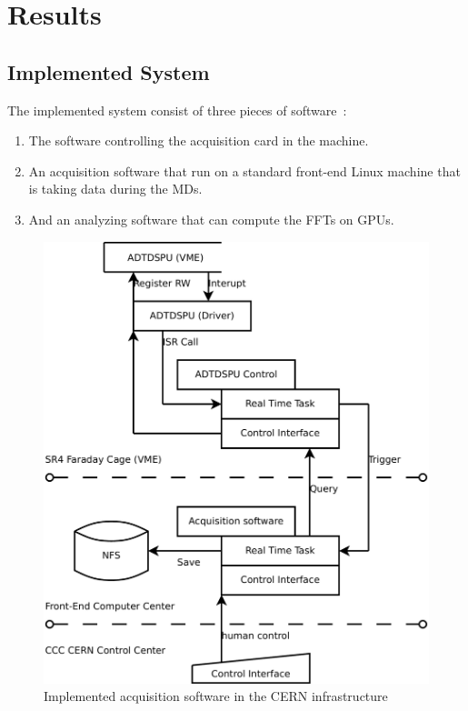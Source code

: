 %

\chapter{Results}

\section{Implemented System}

The implemented system consist of three pieces of software~:
\begin{enumerate}
	\item The software controlling the acquisition card in the machine.
	\item An acquisition software that run on a standard front-end Linux machine that is taking data during the \glspl{MD}.
	\item And an analyzing software that can compute the \glspl{FFT} on \glspl{GPU}.
\end{enumerate}

\begin{figure}[H]
\caption{Implemented acquisition software in the CERN infrastructure}
\centering
\includegraphics[scale=0.3]{ImplementedSoftFesa.pdf}
\end{figure}

